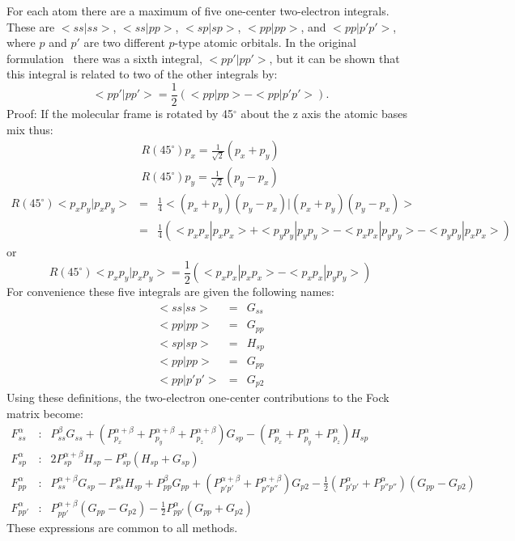 \documentclass[a4paper]{book}
\begin{document}
For each atom there are a maximum of five one-center two-electron integrals.
These are $<\!ss|ss\!>$, $<\!ss|pp\!>$,  $<\!sp|sp\!>$, $<\!pp|pp\!>$, and
$<\!pp|p'p'\!>$, where $p$ and $p'$ are two different $p$-type atomic orbitals.
In the original formulation~\cite{dt4689} there was a sixth integral,
$<\!pp'|pp'\!>$, but it can be shown that this integral is related to two of
the other integrals by:
$$
  <pp'|pp'> = \frac{1}{2}(<pp|pp> - <pp|p'p'>).
$$
Proof:
If the molecular frame is rotated by 45$^\circ$ about
the z axis the atomic bases mix thus:
\begin{eqnarray}
   R(45^\circ)p_x = \frac{1}{\sqrt{2}}(p_x + p_y) \\ \nonumber
   R(45^\circ)p_y = \frac{1}{\sqrt{2}}(p_y - p_x) \nonumber
\end{eqnarray}
\begin{eqnarray}
 R(45^\circ)<p_xp_y|p_xp_y>& =& \frac{1}{4}<(p_x+p_y)(p_y-p_x)|(p_x+p_y)(p_y-p_x)> \nonumber \\
& =& \frac{1}{4}(<p_xp_x|p_xp_x> + <p_yp_y|p_yp_y> - <p_xp_x|p_yp_y> - <p_yp_y|p_xp_x>)\nonumber
\end{eqnarray}
or
$$
 R(45^\circ)<p_xp_y|p_xp_y> =\frac{1}{2}(<p_xp_x|p_xp_x> - <p_xp_x|p_yp_y>)
$$
 For convenience these five integrals are given the following names:
\begin{eqnarray}
    <ss|ss> &=& G_{ss} \nonumber  \\
    <pp|pp>&=&  G_{pp} \nonumber  \\
    <sp|sp>&=&  H_{sp} \nonumber  \\
    <pp|pp>&=&  G_{pp} \nonumber  \\
    <pp|p'p'>&=&  G_{p2}\nonumber
\end{eqnarray}
 Using these definitions, the two-electron one-center
contributions to the Fock matrix become:
\begin{eqnarray}
F_{ss}^{\alpha}&:&P_{ss}^{\beta}G_{ss}+(P_{p_x}^{\alpha+\beta}+P_{p_y}^{\alpha+\beta}+P_{p_z}^{\alpha+\beta})G_{sp}
-(P_{p_x}^{\alpha}+P_{p_y}^{\alpha}+P_{p_z}^{\alpha})H_{sp}\nonumber  \\
F_{sp}^{\alpha}&:&2P_{sp}^{\alpha+\beta}H_{sp}-P_{sp}^{\alpha}(H_{sp}+G_{sp})\nonumber  \\
F_{pp}^{\alpha}&:&P_{ss}^{\alpha+\beta}G_{sp}-P_{ss}^{\alpha}H_{sp}+
P_{pp}^{\beta}G_{pp} +(P_{p'p'}^{\alpha+\beta}+P_{p''p''}^{\alpha+\beta})G_{p2}
-\frac{1}{2}(P_{p'p'}^{\alpha}+P_{p''p''}^{\alpha})(G_{pp}-G_{p2})\nonumber  \\
F_{pp'}^{\alpha}&:&P_{pp'}^{\alpha+\beta}(G_{pp}-G_{p2})
-\frac{1}{2}P_{pp'}^{\alpha}(G_{pp}+G_{p2}) \nonumber
\end{eqnarray}
These expressions are common to all methods.
\end{document}
